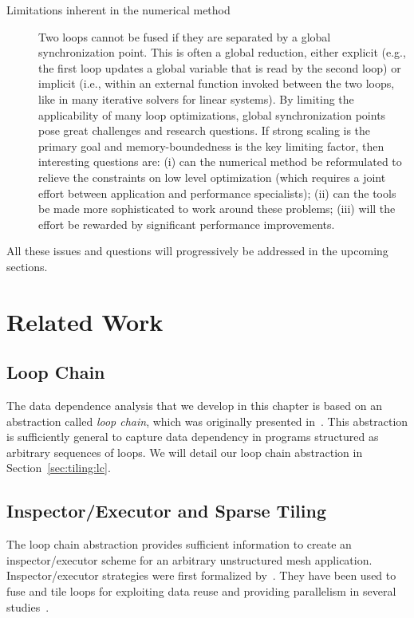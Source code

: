 \begin{description}
\item[Limitations inherent in the numerical method] Two loops cannot be fused if they are separated by a global synchronization point. This is often a global reduction, either explicit (e.g., the first loop updates a global variable that is read by the second loop) or implicit (i.e., within an external function invoked between the two loops, like in many iterative solvers for linear systems). By limiting the applicability of many loop optimizations, global synchronization points pose great challenges and research questions. If strong scaling is the primary goal and memory-boundedness is the key limiting factor, then interesting questions are: (i) can the numerical method be reformulated to relieve the constraints on low level optimization (which requires a joint effort between application and performance specialists); (ii) can the tools be made more sophisticated to work around these problems; (iii) will the effort be rewarded by significant performance improvements.
\end{description}

All these issues and questions will progressively be addressed in the upcoming sections.

\section{Related Work}
\label{sec:tiling:relatedwork}

\subsection*{Loop Chain}
The data dependence analysis that we develop in this chapter is based on an abstraction called \textit{loop chain}, which was originally presented in~\cite{ST-KriegerHIPS2013}. This abstraction is sufficiently general to capture data dependency in programs structured as arbitrary sequences of loops. We will detail our loop chain abstraction in Section~\ref{sec:tiling:lc}.

\subsection*{Inspector/Executor and Sparse Tiling}
The loop chain abstraction provides sufficient information to create an inspector/executor scheme for an arbitrary unstructured mesh application. Inspector/executor strategies were first formalized by~\cite{ST-Saltz91}. They have been used to fuse and tile loops for exploiting data reuse and providing parallelism in several studies~\citep{ST-dimeEtna00,ST-StroutLCPC2002,ST-Demmel08,ST-KriegerIAAA2012}. 

